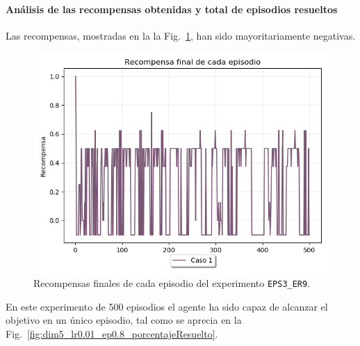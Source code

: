 \paragraph{Análisis de las recompensas obtenidas y total de episodios resueltos} 

Las recompensas, mostradas en la la Fig.~\ref{fig:dim5_lr0.01_ep0.8_recompensa}, han sido mayoritariamente negativas. \\

\begin{figure}
    \centering
    \includegraphics[scale=0.4]{cap5_experimentacion/images/dim5_lr0.01_ep0.8_recompensa.png}
    \caption{Recompensas finales de cada episodio del experimento \texttt{EPS3\_ER9}.}
    \label{fig:dim5_lr0.01_ep0.8_recompensa}
\end{figure}

En este experimento de 500 episodios el agente ha sido capaz de alcanzar el objetivo en un único episodio, tal como se aprecia en la Fig.~\ref{fig:dim5_lr0.01_ep0.8_porcentajeResuelto}. 

